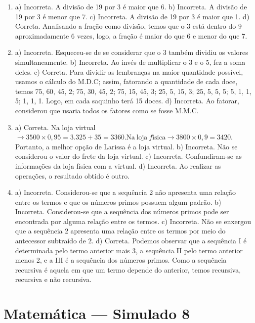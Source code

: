 \begin{enumerate}
\item a) Incorreta. A divisão de 19 por 3 é maior que 6.
b) Incorreta. A divisão de 19 por 3 é menor que 7.
c) Incorreta. A divisão de 19 por 3 é maior que 1.
d) Correta. Analisando a fração como divisão, temos que o 3 está dentro do 9 aproximadamente 6 vezes, logo, a fração é maior do que 6 e menor do que 7.

\item a) Incorreta. Esqueceu-se de se considerar que o 3 também dividiu os valores simultaneamente.
b) Incorreta. Ao invés de multiplicar o 3 e o 5, fez a soma deles.
c) Correta. Para dividir as lembranças na maior quantidade possível, usamos o cálculo do M.D.C; assim, fatorando a quantidade de cada doce, temos 75, 60, 45, 2; 75, 30, 45, 2; 75, 15, 45, 3; 25, 5, 15, 3; 25, 5, 5, 5; 5, 1, 1, 5; 1, 1, 1. Logo, em cada saquinho terá 15 doces.
d) Incorreta. Ao fatorar, considerou que usaria todos os fatores como se fosse M.M.C.

\item a) Correta. Na loja virtual $\rightarrow 3500 \times 0,95 = 3.325 + 35 = 3360. \text{Na}\ \text{loja}\ fí\text{sica} \rightarrow 3800 \times 0,9 = 3420$. Portanto, a melhor opção de Larissa é a loja virtual.
b) Incorreta. Não se considerou o valor do frete da loja virtual.
c) Incorreta. Confundiram-se as informações da loja física com a virtual.
d) Incorreta. Ao realizar as operações, o resultado obtido é outro.

\item a) Incorreta. Considerou-se que a sequência 2 não apresenta uma relação entre os termos e que os números primos possuem algum padrão.
b) Incorreta. Considerou-se que a sequência dos números primos pode ser encontrada por alguma relação entre os termos.
c) Incorreta. Não se enxergou que a sequência 2 apresenta uma relação entre os termos por meio do antecessor subtraído de 2.
d) Correta. Podemos observar que a sequência I é determinada pelo termo anterior mais 3, a sequência II pelo termo anterior menos 2, e a
III é a sequência dos números primos. Como a sequência recursiva é aquela em que um termo depende do anterior, temos recursiva, recursiva e não recursiva.
\end{enumerate}

\section*{Matemática — Simulado 8} 

